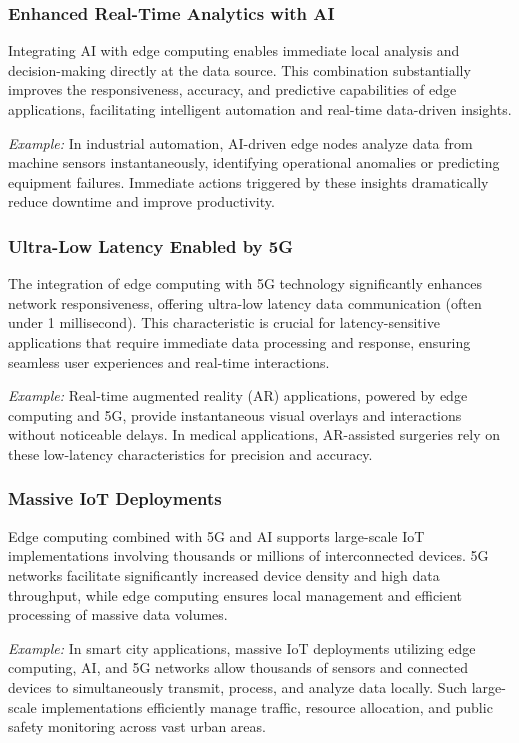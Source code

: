 \documentclass[runningheads]{llncs}
\begin{document}
\subsubsection{Enhanced Real-Time Analytics with AI}
Integrating AI with edge computing enables immediate local analysis and decision-making directly at the data source. This combination substantially improves the responsiveness, accuracy, and predictive capabilities of edge applications, facilitating intelligent automation and real-time data-driven insights.

\textit{Example:} In industrial automation, AI-driven edge nodes analyze data from machine sensors instantaneously, identifying operational anomalies or predicting equipment failures. Immediate actions triggered by these insights dramatically reduce downtime and improve productivity.

\subsubsection{Ultra-Low Latency Enabled by 5G}
The integration of edge computing with 5G technology significantly enhances network responsiveness, offering ultra-low latency data communication (often under 1 millisecond). This characteristic is crucial for latency-sensitive applications that require immediate data processing and response, ensuring seamless user experiences and real-time interactions.

\textit{Example:} Real-time augmented reality (AR) applications, powered by edge computing and 5G, provide instantaneous visual overlays and interactions without noticeable delays. In medical applications, AR-assisted surgeries rely on these low-latency characteristics for precision and accuracy.

\subsubsection{Massive IoT Deployments}
Edge computing combined with 5G and AI supports large-scale IoT implementations involving thousands or millions of interconnected devices. 5G networks facilitate significantly increased device density and high data throughput, while edge computing ensures local management and efficient processing of massive data volumes.

\textit{Example:} In smart city applications, massive IoT deployments utilizing edge computing, AI, and 5G networks allow thousands of sensors and connected devices to simultaneously transmit, process, and analyze data locally. Such large-scale implementations efficiently manage traffic, resource allocation, and public safety monitoring across vast urban areas.
\end{document}
